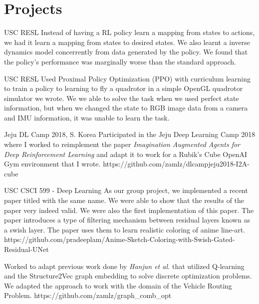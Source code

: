 \documentclass{cv}
\begin{document}
\section{Projects}
\begin{adjustwidth}{0.5cm}{0.5cm}

{USC RESL}
{Instead of having a RL policy learn a mapping from states to actions, we had
it learn a mapping from states to desired states. We also learnt a inverse
dynamics model concerrently from data generated by the policy. We found that
the policy's performance was marginally worse than the standard approach.}{}

{USC RESL}
{Used Proximal Policy Optimization (PPO) with curriculum learning to train a
policy to learning to fly a quadrotor in a simple OpenGL quadrotor simulator we
wrote. We we able to solve the task when we used perfect state information, but
when we changed the state to RGB image data from a camera and IMU information,
it was unable to learn the task.}{}

{Jeju DL Camp 2018, S. Korea}
{Participated in the Jeju Deep Learning Camp 2018 where I worked to
reimplement the paper \textit{Imagination Augmented Agents for
Deep Reinforcement Learning} and adapt it to work for a Rubik's Cube OpenAI
Gym environment that I wrote.}
{https://github.com/zamlz/dlcampjeju2018-I2A-cube}

{USC CSCI 599 - Deep Learning}
{As our group project, we implemented a recent paper titled with the same name.
We were able to show that the results of the paper very indeed valid. We were
also the first implementation of this paper. The paper introduces a type of
filtering mechanism between residual layers known as a swish layer. The paper
uses them to learn realistic coloring of anime line-art.}
{https://github.com/pradeeplam/Anime-Sketch-Coloring-with-Swish-Gated-Residual-UNet}

{Worked to adapt previous work done by \textit{Hanjun et al.} that utilized
Q-learning and the Structure2Vec graph embedding to solve discrete optimization
problems. We adapted the approach to work with the domain of the Vehicle
Routing Problem.}
{https://github.com/zamlz/graph_comb_opt}


\end{adjustwidth}
\end{document}
